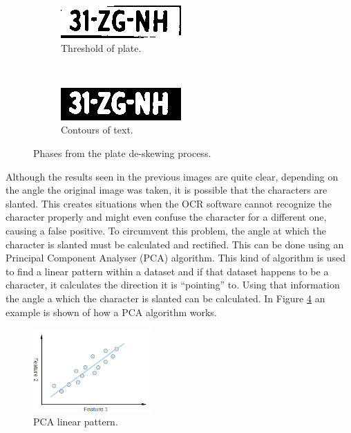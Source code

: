 \begin{figure}[h]
        \begin{subfigure}{0.33\textwidth}
            \includegraphics[width=\textwidth]{plaatjes/remove-border-plate}
            \caption{Threshold of plate.}
            \label{fig:threshold-plate}
        \end{subfigure}%
        ~
        \begin{subfigure}{0.33\textwidth}
            \includegraphics[width=\textwidth]{plaatjes/contour-text}
            \caption{Contours of text.}
            \label{fig:contour-text}
        \end{subfigure}%

        \caption{Phases from the plate de-skewing process.}
        \label{fig:deskewing-plate}
\end{figure}

Although the results seen in the previous images are quite clear, depending on the angle the original image was taken, it is possible that the characters are slanted. This creates situations when the OCR software cannot recognize the character properly and might even confuse the character for a different one, causing a false positive. To circumvent this problem, the angle at which the character is slanted must be calculated and rectified. This can be done using an Principal Component Analyser (PCA) algorithm. This kind of algorithm is used to find a linear pattern within a dataset and if that dataset happens to be a character, it calculates the direction it is ``pointing'' to. Using that information the angle a which the character is slanted can be calculated. In Figure \ref{fig:pca-line} an example is shown of how a PCA algorithm works.

\begin{figure}[ht]
    \centering
    \includegraphics[width=0.4\textwidth]{plaatjes/pca_line}
    \caption{PCA linear pattern. \cite{pca-line-fig}}
    \label{fig:pca-line}
\end{figure}%

